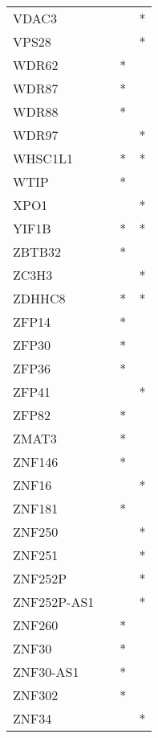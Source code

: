 \begin{longtable}{lccc}
VDAC3        &           &     &       * \\
VPS28        &           &     &       * \\
WDR62        &           &   * &         \\
WDR87        &           &   * &         \\
WDR88        &           &   * &         \\
WDR97        &           &     &       * \\
WHSC1L1      &           &   * &       * \\
WTIP         &           &   * &         \\
XPO1         &           &     &       * \\
YIF1B        &           &   * &       * \\
ZBTB32       &           &   * &         \\
ZC3H3        &           &     &       * \\
ZDHHC8       &           &   * &       * \\
ZFP14        &           &   * &         \\
ZFP30        &           &   * &         \\
ZFP36        &           &   * &         \\
ZFP41        &           &     &       * \\
ZFP82        &           &   * &         \\
ZMAT3        &           &   * &         \\
ZNF146       &           &   * &         \\
ZNF16        &           &     &       * \\
ZNF181       &           &   * &         \\
ZNF250       &           &     &       * \\
ZNF251       &           &     &       * \\
ZNF252P      &           &     &       * \\
ZNF252P-AS1  &           &     &       * \\
ZNF260       &           &   * &         \\
ZNF30        &           &   * &         \\
ZNF30-AS1    &           &   * &         \\
ZNF302       &           &   * &         \\
ZNF34        &           &     &       * \\

\end{longtable}
